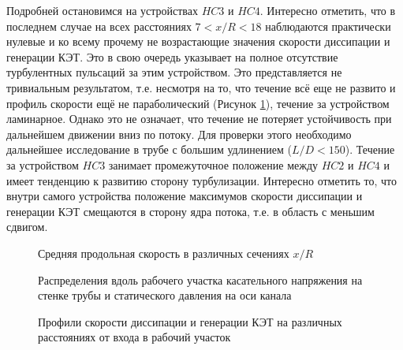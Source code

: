 %
Подробней остановимся на устройствах $HC3$ и $HC4$. 
%
Интересно отметить, что в последнем случае на всех расстояниях $7 < x/R < 18$ 
наблюдаются практически нулевые и ко всему прочему не возрастающие значения скорости диссипации и генерации КЭТ. 
%
Это в свою очередь указывает на полное отсутствие турбулентных пульсаций за этим устройством. 
%
Это представляется не тривиальным результатом, т.е. несмотря на то, что течение всё еще не 
развито и профиль скорости ещё не параболический (Рисунок \ref{ch3:fig:vels}), течение за устройством ламинарное. 
%
Однако это не означает, что течение не потеряет устойчивость при дальнейшем движении вниз по потоку. 
%
Для проверки этого необходимо дальнейшее исследование в трубе с большим удлинением ($L/D < 150$). 
%
Течение за устройством $HC3$ занимает промежуточное положение между $HC2$ и $HC4$ 
и имеет тенденцию к развитию сторону турбулизации. 
%
Интересно отметить то, что внутри самого устройства положение максимумов скорости диссипации 
и генерации КЭТ смещаются в сторону ядра потока, т.е. в область с меньшим сдвигом.
%


\begin{figure}[ht]
    \caption{Средняя продольная скорость в различных сечениях $x/R$}\label{ch3:fig:vels}
\end{figure}

\begin{figure}[ht]
    \caption{Распределения вдоль рабочего участка касательного напряжения на стенке трубы и статического давления на оси канала}\label{ch3:fig:tau}
\end{figure}

\begin{figure}[ht]
    \caption{Профили скорости диссипации и генерации КЭТ на различных расстояниях от входа в рабочий участок}\label{ch3:fig:tke}
\end{figure}


